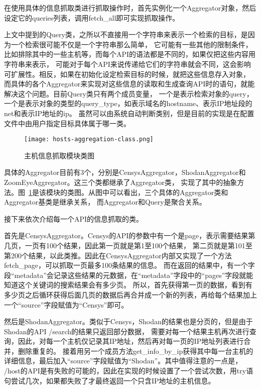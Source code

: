 在使用具体的信息抓取类进行抓取操作时，首先实例化一个Aggregator对象，然后设定它的queries列表，调用fetch\_all即可实现抓取操作。

上文中提到的Query类，之所以不直接用一个字符串来表示一个检索的目标，是因为一个检索很可能不仅是一个字符串那么简单，
它可能有一些其他的限制条件，比如排除其中的一些主机等，而每个API的语法都是不同的，如果仅把这些内容用字符串来表示，
可能对于每个API来说传递给它们的字符串就会不同，这会影响可扩展性。相反，如果在初始化设定检索目标的时候，就把这些信息存入对象，
而具体的各个Aggregator来实现对这些信息的读取和生成查询API时的语句，就能解决这个问题。目前Query类只有两个成员变量，
一个是表示检索对象的query，一个是表示对象的类型的query\_type，如表示域名的hostname、表示IP地址段的net和表示IP地址的ip。
虽然可以由系统自动判断类别，但是目前的实现是在配置文件中由用户指定目标具体属于哪一类。

\begin{figure}[H]
    \centering
    \texttt{[image: hosts-aggregation-class.png]}
    \caption{主机信息抓取模块类图}
    \label{fig:hosts-class}
\end{figure}

具体的Aggregator目前有3个，分别是CensysAggregator，ShodanAggregator和ZoomEyeAggregator。这三个类都继承了Aggregator类，
实现了其中的抽象方法。图~\ref{fig:hosts-class}是该模块的类图。从图中可以看出，三个具体的Aggregator类和Aggregator基类是继承关系，
而Aggregator和Query是聚合关系。

接下来依次介绍每一个API的信息抓取的类。

首先是CensysAggregator。Censys的API的参数中有一个是page，表示需要结果第几页，一页有100个结果，因此第一页就是第1至100个结果，
第二页就是第101至第200个结果，以此类推。因此在CensysAggregator内部又实现了一个方法fetch\_page，可以抓取一页最多100条结果的信息。
而在返回的结果中，有一个字段“metadata”会记录这些结果的元数据，在“metadata”字段中的“pages”字段就能知道这个关键词的搜索结果会有多少页。
所以，首先获得第一页的数据，看到有多少页之后循环获得后面几页的数据后再合并成一个新的列表，再给每个结果加上一个“source”字段赋值为“Censys”即可。

然后是ShodanAggregator。类似于Censys，Shodan的结果也是分页的，但是由于Shodan的API /search的结果只返回部分数据，
需要对每一个结果主机再次进行查询，因此，对每一个主机仅记录其IP地址，然后再对每一页的IP地址列表进行合并，删除重复的。
接着用另一个成员方法get\_info\_by\_ip获得其中每一台主机的详细信息，最后加入“source”字段赋值为“Shodan”。其中值得注意的一点是，
/host的API是有失败的可能的，因此在实现的时候设置了一个尝试次数，用try语句尝试几次，如果都失败了才最终返回一个只含IP地址的主机信息。

